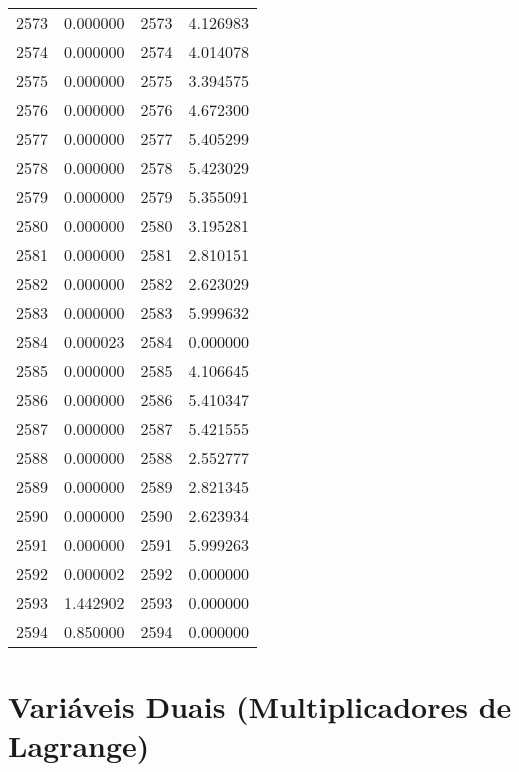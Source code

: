 \documentclass[12pt]{article}
\begin{document}
\begin{longtable}{@{}cccc@{}}
2573 & 0.000000 & 2573 & 4.126983 \\
2574 & 0.000000 & 2574 & 4.014078 \\
2575 & 0.000000 & 2575 & 3.394575 \\
2576 & 0.000000 & 2576 & 4.672300 \\
2577 & 0.000000 & 2577 & 5.405299 \\
2578 & 0.000000 & 2578 & 5.423029 \\
2579 & 0.000000 & 2579 & 5.355091 \\
2580 & 0.000000 & 2580 & 3.195281 \\
2581 & 0.000000 & 2581 & 2.810151 \\
2582 & 0.000000 & 2582 & 2.623029 \\
2583 & 0.000000 & 2583 & 5.999632 \\
2584 & 0.000023 & 2584 & 0.000000 \\
2585 & 0.000000 & 2585 & 4.106645 \\
2586 & 0.000000 & 2586 & 5.410347 \\
2587 & 0.000000 & 2587 & 5.421555 \\
2588 & 0.000000 & 2588 & 2.552777 \\
2589 & 0.000000 & 2589 & 2.821345 \\
2590 & 0.000000 & 2590 & 2.623934 \\
2591 & 0.000000 & 2591 & 5.999263 \\
2592 & 0.000002 & 2592 & 0.000000 \\
2593 & 1.442902 & 2593 & 0.000000 \\
2594 & 0.850000 & 2594 & 0.000000 \\

\end{longtable}

\section{Variáveis Duais (Multiplicadores de Lagrange)}
\end{document}
